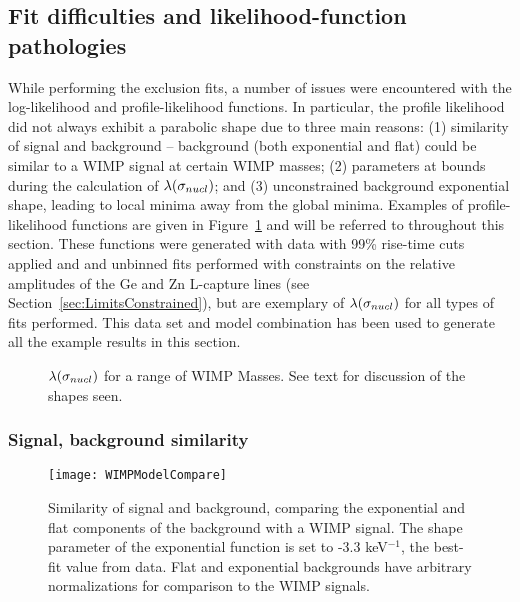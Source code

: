 	\subsection{Fit difficulties and likelihood-function pathologies}
	\label{sec:LLPathologies}
			
While performing the exclusion fits, a number of issues were encountered with the log-likelihood and profile-likelihood functions.  In particular, the profile likelihood did not always exhibit a parabolic shape due to three main reasons: (1) similarity of signal and background -- background (both exponential and flat) could be similar to a WIMP signal at certain WIMP masses; (2) parameters at bounds during the calculation of $\pll$; and (3) unconstrained background exponential shape, leading to local minima away from the global minima.  Examples of profile-likelihood functions are given in Figure~\ref{fig:FitPathologies} and will be referred to throughout this section.  These functions were generated with data with 99\% rise-time cuts applied and and unbinned fits performed with constraints on the relative amplitudes of the Ge and Zn L-capture lines (see Section~\ref{sec:LimitsConstrained}), but are exemplary of $\pll$ for all types of fits performed.  This data set and model combination has been used to generate all the example results in this section.
		
		\begin{figure}
			\centering
			\caption[$\pll$ for a range of WIMP Masses]
			{$\pll$ for a range of WIMP Masses.  See text for discussion of the shapes
			seen.}
			\label{fig:FitPathologies}
		\end{figure}
		
		\subsubsection{Signal, background similarity}
		\label{sec:LLPathoSBSimilarity}
			
			\begin{figure}
				\centering
				\texttt{[image: WIMPModelCompare]}
				\caption[Similarity of WIMP signal and background]
				{Similarity of signal and background, comparing the exponential and flat components of the background with a WIMP signal.  
				The shape parameter of the exponential function is set to -3.3 keV$^{-1}$, the best-fit value from data.  Flat and exponential backgrounds have 
				arbitrary normalizations for comparison to the WIMP signals.}
				\label{fig:SBSimilarity}
			\end{figure}			
			
